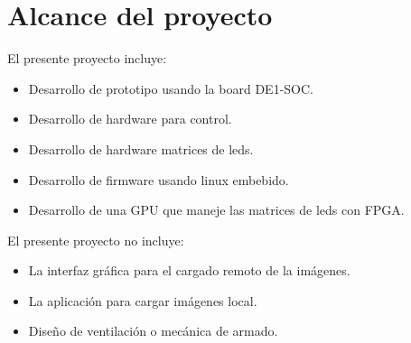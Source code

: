 \section{Alcance del proyecto}
El presente proyecto incluye:

\begin{itemize}
\item Desarrollo de prototipo usando la board DE1-SOC.
\item Desarrollo de hardware para control.
\item Desarrollo de hardware matrices de leds.
\item Desarrollo de firmware usando linux embebido.
\item Desarrollo de una GPU que maneje las matrices de leds con FPGA.


\end{itemize}

El presente proyecto no incluye:

 \begin{itemize}
\item La interfaz gráfica para el cargado remoto de la imágenes.
\item La aplicación para cargar imágenes local.
\item Diseño de ventilación o mecánica de armado.

\end{itemize}




